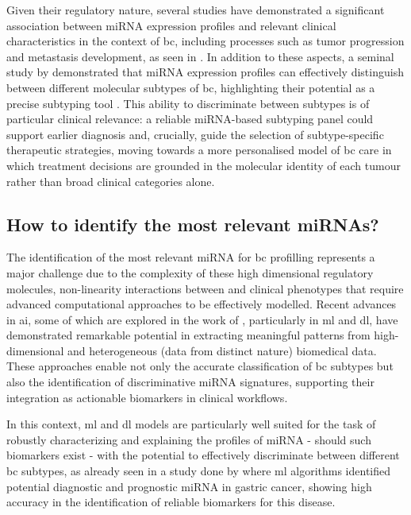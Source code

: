 Given their regulatory nature, several studies have demonstrated a significant
association between miRNA expression profiles and relevant clinical
characteristics in the context of \gls{bc}, including processes such as tumor
progression and metastasis development, as seen in
\cite{_Mendes2022Nanodelivery,
  mirnas_in_bc_Muñoz2023}. In addition to these aspects, a seminal study by
\textcite{Blenkiron2007MicroRNA} demonstrated that
miRNA expression profiles can effectively distinguish between different
molecular subtypes of \gls{bc}, highlighting their potential as a precise
subtyping tool \cite{Blenkiron2007MicroRNA}. This ability to discriminate
between subtypes is of particular clinical relevance: a reliable
miRNA-based subtyping panel could support earlier diagnosis and, 
crucially, guide the selection of subtype-specific therapeutic strategies, 
moving towards a more personalised model of \gls{bc} care in which treatment 
decisions are grounded in the molecular identity of each tumour rather than 
broad clinical categories alone.

\subsection{How to identify the most relevant miRNAs?}

The identification of the most relevant miRNA for \gls{bc} profilling
represents a major challenge due to the complexity of these high
dimensional regulatory molecules, non-linearity interactions between and
clinical phenotypes that require advanced computational approaches to be
effectively modelled. Recent advances in \gls{ai}, some of which are explored
in the work of \textcite{ml_for_microRNA_Luo2023MachineLearning}, particularly
in \gls{ml} and \gls{dl}, have demonstrated remarkable potential in extracting
meaningful patterns from high-dimensional and heterogeneous (data from distinct
nature) biomedical data. These approaches enable not only the accurate
classification of \gls{bc} subtypes but also the identification of
discriminative miRNA signatures, supporting their integration as
actionable biomarkers in clinical workflows.

In this context, \gls{ml} and \gls{dl} models are particularly well suited for
the task of robustly characterizing and explaining the profiles of miRNA
- should such biomarkers exist - with the potential to effectively discriminate
between different \gls{bc} subtypes, as already seen in a study done by
\textcite{ml_gastric_Azari2023} where \gls{ml} algorithms identified potential
diagnostic and prognostic miRNA in gastric cancer, showing high accuracy
in the identification of reliable biomarkers for this disease.

